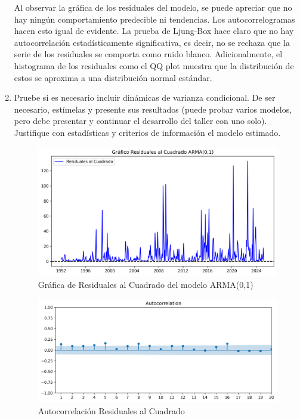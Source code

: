 \documentclass{article}
\theoremstyle{remark}
\theoremstyle{definition}
\begin{document}
\begin{enumerate}[label = \emph{\alph*})]
\begin{tcolorbox}[title=Soluci\'on 2.e]
Al observar la gráfica de los residuales del modelo, se puede apreciar que no hay ningún comportamiento predecible  ni tendencias. Los autocorrelogramas hacen esto igual de evidente. La prueba de Ljung-Box hace claro que no hay autocorrelación estadísticamente significativa, es decir, no se rechaza que la serie de los residuales se comporta como ruido blanco. Adicionalmente, el histograma de los residuales como el QQ plot muestra que la distribución de estos se aproxima a una distribución normal estándar.
        \end{tcolorbox}
    \item {Pruebe si es necesario incluir din\'amicas de varianza condicional. De ser necesario, est\'imelas y presente sus resultados (puede probar varios modelos, pero debe presentar y continuar el desarrollo del taller con uno solo). Justifique con estad\'isticas y criterios de informaci\'on el modelo estimado.}
        \begin{tcolorbox}[title=Soluci\'on 2.f]
            \begin{figure}[H]
                \centering
                \includegraphics[width=0.9\linewidth]{output/graf_resid2.png}
                \caption{Gr\'afica de Residuales al Cuadrado del modelo ARMA(0,1)}
                \label{fig:graf_resid2}
            \end{figure}
            
            \begin{figure}[H]
                \centering
                \includegraphics[width=0.9\linewidth]{output/acf_residuales2.png}
                \caption{Autocorrelaci\'on Residuales al Cuadrado}
                \label{fig:acf_resid2}
            \end{figure}


\end{tcolorbox}
\end{enumerate}
\end{document}
